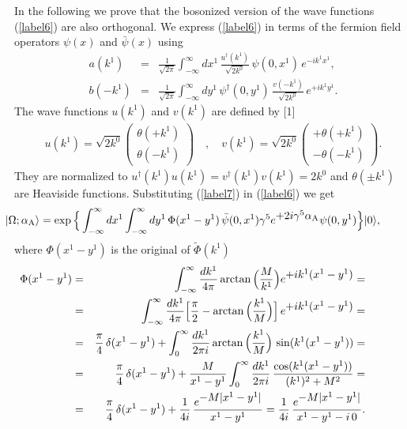\documentclass[a4paper,12pt] {article}
\begin{document}
In the following we prove that the bosonized version of the wave
functions (\ref{label6}) are also orthogonal. We express
(\ref{label6}) in terms of the fermion field operators $\psi(x)$ and
$\bar{\psi}(x)$ using
%
\begin{eqnarray}\label{label7}
a(k^1) &=& \frac{1}{\sqrt{2\pi}}\int^{\infty}_{-\infty}dx^1\,
\frac{u^{\dagger}(k^1)}{\sqrt{2k^0}}\,\psi(0,x^1)\,e^{\textstyle
-ik^1x^1},\nonumber\\ b(-k^1)
&=&\frac{1}{\sqrt{2\pi}}\int^{\infty}_{-\infty}dy^1\,
\psi^{\dagger}(0,y^1)\,\frac{v(- k^1)}{\sqrt{2k^0}}\,e^{\textstyle
+ik^1y^1}.
\end{eqnarray}
%
The wave functions $u(k^1)$ and $v(k^1)$ are defined by [1]
%
\begin{eqnarray}\label{label8}
u(k^1) = \sqrt{2k^0}{\displaystyle \left(\begin{array}{c}\theta(+k^1)
\\ \theta(-k^1)
\end{array}\right)}\quad,\quad v(k^1) = \sqrt{2k^0}{\displaystyle \left(\begin{array}{c} + \theta(+k^1)
\\ - \theta(-k^1)
\end{array}\right)}.
\end{eqnarray}
%
They are normalized to $u^{\dagger}(k^1)u(k^1) =
v^{\dagger}(k^1)v(k^1) = 2k^0$ and $\theta(\pm k^1)$ are Heaviside
functions. Substituting (\ref{label7}) in (\ref{label6}) we get
%
\begin{eqnarray}\label{label9}
\hspace{-0.5in}|\Omega; \alpha_{\rm A}\rangle = \exp\Big\{
\int^{\infty}_{-\infty}dx^1\int^{\infty}_{-\infty}dy^1\,\Phi(x^1 -
y^1)\,\bar{\psi}(0,x^1)\gamma^5e^{\textstyle +2i\gamma^5\alpha_{\rm
A}}\psi(0,y^1)\Big\}|0\rangle,
\end{eqnarray}
%
where $\Phi(x^1 - y^1)$ is the original of $\tilde{\Phi}(k^1)$
%
\begin{eqnarray}\label{label10}
\hspace{-0.5in}\Phi(x^1 - y^1) &=& \int^{\infty}_{-\infty}
\frac{dk^1}{4\pi} \arctan\Big(\frac{M}{k^1}\Big)e^{\textstyle
+ik^1(x^1 - y^1)} = \nonumber\\
\hspace{-0.5in}&=& \int^{\infty}_{-\infty}
\frac{dk^1}{4\pi}\Big[\frac{\pi}{2} -
\arctan\Big(\frac{k^1}{M}\Big)\Big]\,e^{\textstyle +ik^1(x^1 - y^1)}=
\nonumber\\
\hspace{-0.5in}&=& \frac{\pi}{4}\,\delta(x^1 - y^1) + \int^{\infty}_0
\frac{dk^1}{2\pi i}\arctan\Big(\frac{k^1}{M}\Big)\,\sin(k^1(x^1 -
y^1)) =\nonumber\\
\hspace{-0.5in}&=&\frac{\pi}{4}\,\delta(x^1 - y^1) +
\frac{M}{x^1 - y^1}\int^{\infty}_0 \frac{dk^1}{2\pi
i}\,\frac{\cos(k^1(x^1 - y^1))}{(k^1)^2 + M^2}=\nonumber\\
\hspace{-0.5in}&=& \frac{\pi}{4}\,\delta(x^1 - y^1)+
\frac{1}{4i}\,\frac{\displaystyle e^{\textstyle -M|x^1 - y^1|}}{x^1 -
y^1} = \frac{1}{4i}\,\frac{\displaystyle e^{\textstyle -M|x^1 -
y^1|}}{x^1 - y^1 - i\,0}.
\end{eqnarray}
\end{document}

